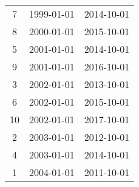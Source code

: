 % 
\begin{tabular}{ccc}
  \hline
  \hline
7 & 1999-01-01 & 2014-10-01 \\ 
  8 & 2000-01-01 & 2015-10-01 \\ 
  5 & 2001-01-01 & 2014-10-01 \\ 
  9 & 2001-01-01 & 2016-10-01 \\ 
  3 & 2002-01-01 & 2013-10-01 \\ 
  6 & 2002-01-01 & 2015-10-01 \\ 
  10 & 2002-01-01 & 2017-10-01 \\ 
  2 & 2003-01-01 & 2012-10-01 \\ 
  4 & 2003-01-01 & 2014-10-01 \\ 
  1 & 2004-01-01 & 2011-10-01 \\ 
   \hline
\end{tabular}
